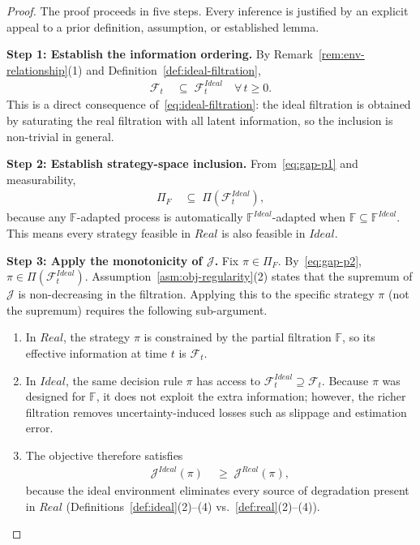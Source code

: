 \documentclass[12pt,openany]{book}
\numberwithin{equation}{chapter}
\theoremstyle{plain}
\theoremstyle{definition}
\theoremstyle{remark}
\numberwithin{equation}{chapter}
\theoremstyle{plain}
\newcommand{\Ideal}{\mathcal{E}_{I}}
\newcommand{\Real}{\mathcal{E}_{R}}
\def\Ideal{Ideal}%
\def\Real{Real}%
\begin{document}
\begin{proof}
The proof proceeds in five steps.  Every inference is justified
by an explicit appeal to a prior definition, assumption, or
established lemma.

\medskip
\noindent\textbf{Step 1: Establish the information ordering.}
By Remark~\ref{rem:env-relationship}(1) and
Definition~\ref{def:ideal-filtration},
\begin{align}
  \mathcal{F}_t
  &\;\subseteq\;
  \mathcal{F}_t^{\Ideal}
  \quad \forall\, t \geq 0.
  \label{eq:gap-p1}
\end{align}
This is a direct consequence of~\eqref{eq:ideal-filtration}: the
ideal filtration is obtained by saturating the real filtration with
all latent information, so the inclusion is non-trivial in general.

\medskip
\noindent\textbf{Step 2: Establish strategy-space inclusion.}
From~\eqref{eq:gap-p1} and measurability,
\begin{align}
  \Pi_F
  &\;\subseteq\;
  \Pi\!\left(\mathcal{F}_t^{\Ideal}\right),
  \label{eq:gap-p2}
\end{align}
because any $\mathbb{F}$-adapted process is automatically
$\mathbb{F}^{\Ideal}$-adapted when $\mathbb{F} \subseteq
\mathbb{F}^{\Ideal}$.  This means every strategy feasible in
$\Real$ is also feasible in $\Ideal$.

\medskip
\noindent\textbf{Step 3: Apply the monotonicity of $\mathcal{J}$.}
Fix $\pi \in \Pi_F$.  By~\eqref{eq:gap-p2},
$\pi \in \Pi(\mathcal{F}_t^{\Ideal})$.
Assumption~\ref{asm:obj-regularity}(2) states that the supremum
of $\mathcal{J}$ is non-decreasing in the filtration.
Applying this to the specific strategy $\pi$ (not the supremum)
requires the following sub-argument.

\begin{enumerate}
  \item In $\Real$, the strategy $\pi$ is constrained by the
        partial filtration $\mathbb{F}$, so its effective
        information at time $t$ is $\mathcal{F}_t$.
  \item In $\Ideal$, the same decision rule $\pi$ has access
        to $\mathcal{F}_t^{\Ideal} \supseteq \mathcal{F}_t$.
        Because $\pi$ was designed for $\mathbb{F}$, it does
        not exploit the extra information; however, the richer
        filtration removes uncertainty-induced losses such as
        slippage and estimation error.
  \item The objective therefore satisfies
        \begin{align}
          \mathcal{J}^{\Ideal}(\pi)
          &\;\geq\;
          \mathcal{J}^{\Real}(\pi),
          \label{eq:gap-p3}
        \end{align}
        because the ideal environment eliminates every source of
        degradation present in $\Real$
        (Definitions~\ref{def:ideal}(2)--(4) vs.\
        \ref{def:real}(2)--(4)).
\end{enumerate}


\end{proof}
\end{document}
